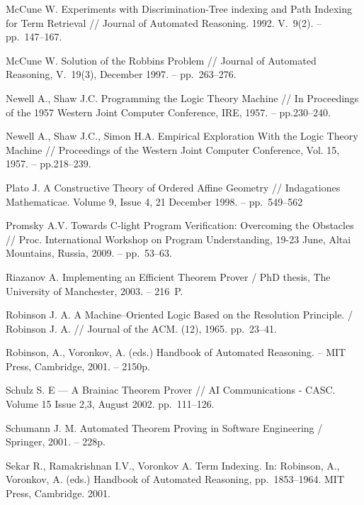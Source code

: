 \begin{thebibliography}{99}
 McCune W. Experiments with Discrimination-Tree indexing and Path Indexing for Term Retrieval // Journal of Automated Reasoning. 1992. V.~9(2). -- pp.~147--167.

 McCune W. Solution of the Robbins Problem // Journal of Automated Reasoning, V.~19(3), December 1997. -- pp.~263--276.


 Newell A., Shaw J.C. Programming the Logic Theory Machine // In Proceedings of the 1957 Western Joint Computer Conference, IRE, 1957. -- pp.230--240.

 Newell A., Shaw J.C., Simon H.A. Empirical Exploration With the Logic Theory Machine // Proceedings of the Western Joint Computer Conference, Vol. 15, 1957. -- pp.218--239.

 Plato J. A Constructive Theory of Ordered Affine Geometry // Indagationes Mathematicae. Volume 9, Issue 4, 21 December 1998. -- pp.~549--562

 Promsky A.V. Towards C-light Program Verification: Overcoming the Obstacles // Proc. International Workshop on Program Understanding, 19-23 June, Altai Mountains, Russia, 2009. -- pp.~53--63.

 Riazanov A. Implementing an Efficient Theorem Prover /  PhD thesis, The University of Manchester, 2003. -- 216~P.

 Robinson J. A. A Machine--Oriented Logic Based on the Resolution Principle. / Robinson J. A. //  Journal of the ACM. (12), 1965. pp.~23--41.

 Robinson, A., Voronkov, A. (eds.) Handbook of Automated Reasoning. -- MIT Press, Cambridge, 2001. -- 2150p.

 Schulz S. E --- A Brainiac Theorem Prover // AI Communications - CASC. Volume 15 Issue 2,3, August 2002. pp.~111--126.

 Schumann J. M. Automated Theorem Proving in Software Engineering / Springer, 2001. -- 228p.

 Sekar R., Ramakrishnan I.V., Voronkov A. Term Indexing. In: Robinson, A., Voronkov, A. (eds.) Handbook of Automated Reasoning, pp.~1853--1964. MIT Press, Cambridge. 2001.


\end{thebibliography}
